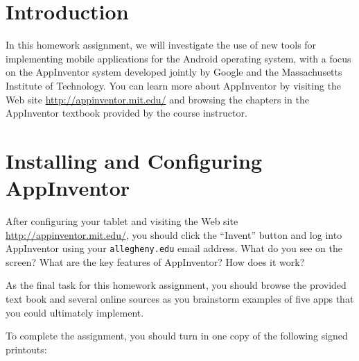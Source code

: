


\usepackage[compact]{titlesec}



\vspace*{-.1in}
\section*{Introduction}

In this homework assignment, we will investigate the use of new tools for implementing mobile applications for the
Android operating system, with a focus on the AppInventor system developed jointly by Google and the
Massachusetts Institute of Technology.  You can learn more about AppInventor by visiting the Web site
\url{http://appinventor.mit.edu/} and browsing the chapters in the AppInventor textbook provided by the course
instructor.

\section*{Installing and Configuring AppInventor}



After configuring your tablet and visiting the Web site \url{http://appinventor.mit.edu/}, you should click the
``Invent'' button and log into AppInventor using your {\tt allegheny.edu} email address.  What do you see on the screen?
What are the key features of AppInventor? How does it work?




As the final task for this homework assignment, you should browse the provided text book and several online sources as
you brainstorm examples of five apps that you could ultimately implement.


\noindent
To complete the assignment, you should turn in one copy of the following signed printouts: 
\vspace*{-.1in}


